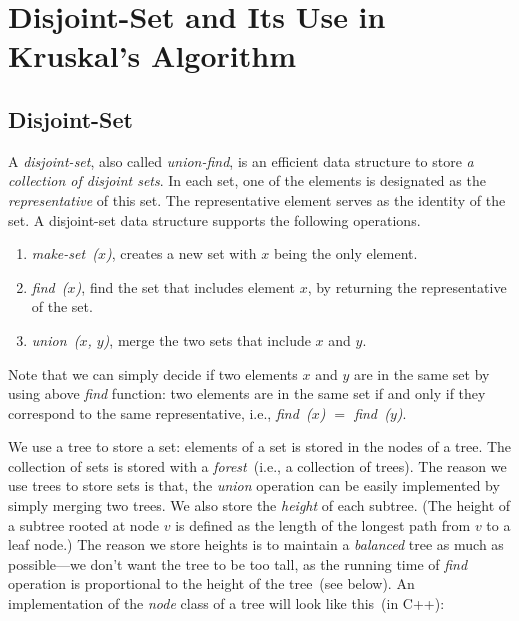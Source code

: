 \setcounter{definition}{0} \setcounter{property}{0} \setcounter{claim}{0} \setcounter{fact}{0} \setcounter{corollary}{0} \setcounter{figure}{0}
\section{Disjoint-Set and Its Use in Kruskal's Algorithm}

\subsection*{Disjoint-Set}

A \emph{disjoint-set}, also called \emph{union-find},
is an efficient data structure to store \emph{a collection of disjoint sets}.
In each set, one of the elements is designated as the \emph{representative}
of this set. The representative element serves
as the identity of the set. 
A disjoint-set data structure supports the following operations.
\vspace*{-\topsep}
\begin{enumerate}
\item \emph{make-set~($x$)}, creates a new set with $x$ being the only element.
\item \emph{find~($x$)}, find the set that includes element $x$, by returning the representative of the set.
\item \emph{union~($x$, $y$)}, merge the two sets that include $x$ and $y$.
\end{enumerate}

Note that we can simply decide if two elements $x$ and $y$ are in the same set
by using above \emph{find} function: two elements are in the same set
if and only if they correspond to the same representative, i.e., \emph{find~($x$) $=$ find~($y$)}.

We use a tree to store a set: elements of a set is stored in the nodes of a tree.
The collection of sets is stored with a \emph{forest}~(i.e., a collection of trees).
The reason we use trees to store sets is that, the \emph{union} operation
can be easily implemented by simply merging two trees.
We also store the \emph{height} of each subtree.
(The height of a subtree rooted at node $v$ is defined as the length of the longest path 
from $v$ to a leaf node.) The reason we store heights is to maintain a \emph{balanced} tree
as much as possible---we don't want the tree to be too tall, as the running time
of \emph{find} operation is proportional to the height of the tree~(see below).
An implementation of the \emph{node} class of a tree will look like this~(in C++):

